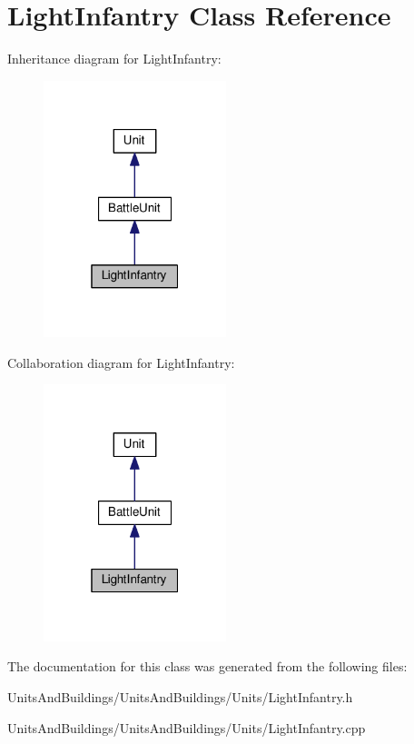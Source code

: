 \hypertarget{class_light_infantry}{}\section{Light\+Infantry Class Reference}
\label{class_light_infantry}


Inheritance diagram for Light\+Infantry\+:
\nopagebreak
\begin{figure}[H]
\begin{center}
\leavevmode
\includegraphics[width=151pt]{class_light_infantry__inherit__graph}
\end{center}
\end{figure}


Collaboration diagram for Light\+Infantry\+:
\nopagebreak
\begin{figure}[H]
\begin{center}
\leavevmode
\includegraphics[width=151pt]{class_light_infantry__coll__graph}
\end{center}
\end{figure}


The documentation for this class was generated from the following files\+:\begin{DoxyCompactItemize}
\item 
Units\+And\+Buildings/\+Units\+And\+Buildings/\+Units/Light\+Infantry.\+h\item 
Units\+And\+Buildings/\+Units\+And\+Buildings/\+Units/Light\+Infantry.\+cpp\end{DoxyCompactItemize}
